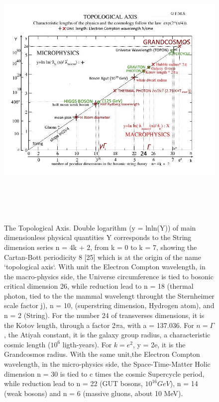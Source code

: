 \documentclass[twoside,draft]{article}
\begin{document}
\begin{sloppypar}
{\begin{figure}
\centering
\includegraphics[width=\textwidth,height=14cm]{./figures/figure}
\caption{The Topological Axis. Double logarithm (y = lnln(Y)) of main dimensionless physical quantities 
Y corresponds to the String dimension series n = 4k + 2, from k = 0 to k = 7, showing the Cartan-Bott
periodicity 8 [25] which is at the origin of the name `topological axis`.
    With unit the Electron Compton wavelength, in the macro-physics side, the Universe circumference 
    is tied to bosonic critical dimension 26, while reduction lead to n = 18 (thermal photon, 
    tied to the the mammal wavelengt throught the Sternheimer scale factor j), n = 10, (superstring 
    dimension, Hydrogen atom), and n = 2 (String). For the number 24 of transverses dimensions, it is
    the Kotov length, through a factor 2$\pi$a, with a = 137.036. For $n = \Gamma $, the Atiyah constant, it is the 
    galaxy group radius, a characteristic cosmic length ($10^{6}$ ligth-years). For $k = e^{2}$, y = 2e, it is 
    the Grandcosmos radius.
    With the same unit,the Electron Compton wavelength, in the micro-physics side, the Space-Time-Matter
    Holic dimension n = 30 is tied to c times the cosmic Supercycle period, while reduction lead to
    n = 22 (GUT bosons, $10^{16} GeV$), n = 14 (weak bosons) and n = 6 (massive gluons, about 10 MeV).
}
\end{figure}}
\end{sloppypar}
\end{document}
